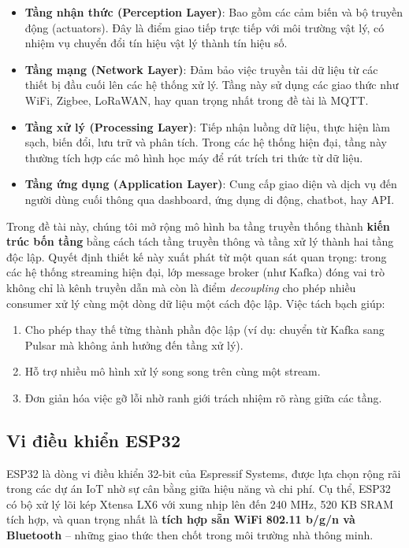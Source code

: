 \begin{itemize}
  \item \textbf{Tầng nhận thức (Perception Layer)}: Bao gồm các cảm biến và bộ truyền động (actuators). Đây là điểm giao tiếp trực tiếp với môi trường vật lý, có nhiệm vụ chuyển đổi tín hiệu vật lý thành tín hiệu số.

  \item \textbf{Tầng mạng (Network Layer)}: Đảm bảo việc truyền tải dữ liệu từ các thiết bị đầu cuối lên các hệ thống xử lý. Tầng này sử dụng các giao thức như WiFi, Zigbee, LoRaWAN, hay quan trọng nhất trong đề tài là MQTT.

  \item \textbf{Tầng xử lý (Processing Layer)}: Tiếp nhận luồng dữ liệu, thực hiện làm sạch, biến đổi, lưu trữ và phân tích. Trong các hệ thống hiện đại, tầng này thường tích hợp các mô hình học máy để rút trích tri thức từ dữ liệu.

  \item \textbf{Tầng ứng dụng (Application Layer)}: Cung cấp giao diện và dịch vụ đến người dùng cuối thông qua dashboard, ứng dụng di động, chatbot, hay API.
\end{itemize}

Trong đề tài này, chúng tôi mở rộng mô hình ba tầng truyền thống thành \textbf{kiến trúc bốn tầng} bằng cách tách tầng truyền thông và tầng xử lý thành hai tầng độc lập. Quyết định thiết kế này xuất phát từ một quan sát quan trọng: trong các hệ thống streaming hiện đại, lớp message broker (như Kafka) đóng vai trò không chỉ là kênh truyền dẫn mà còn là điểm \textit{decoupling} cho phép nhiều consumer xử lý cùng một dòng dữ liệu một cách độc lập. Việc tách bạch giúp:

\begin{enumerate}
  \item Cho phép thay thế từng thành phần độc lập (ví dụ: chuyển từ Kafka sang Pulsar mà không ảnh hưởng đến tầng xử lý).
  \item Hỗ trợ nhiều mô hình xử lý song song trên cùng một stream.
  \item Đơn giản hóa việc gỡ lỗi nhờ ranh giới trách nhiệm rõ ràng giữa các tầng.
\end{enumerate}

\subsection{Vi điều khiển ESP32}

ESP32 là dòng vi điều khiển 32-bit của Espressif Systems, được lựa chọn rộng rãi trong các dự án IoT nhờ sự cân bằng giữa hiệu năng và chi phí. Cụ thể, ESP32 có bộ xử lý lõi kép Xtensa LX6 với xung nhịp lên đến 240 MHz, 520 KB SRAM tích hợp, và quan trọng nhất là \textbf{tích hợp sẵn WiFi 802.11 b/g/n và Bluetooth} – những giao thức then chốt trong môi trường nhà thông minh.

